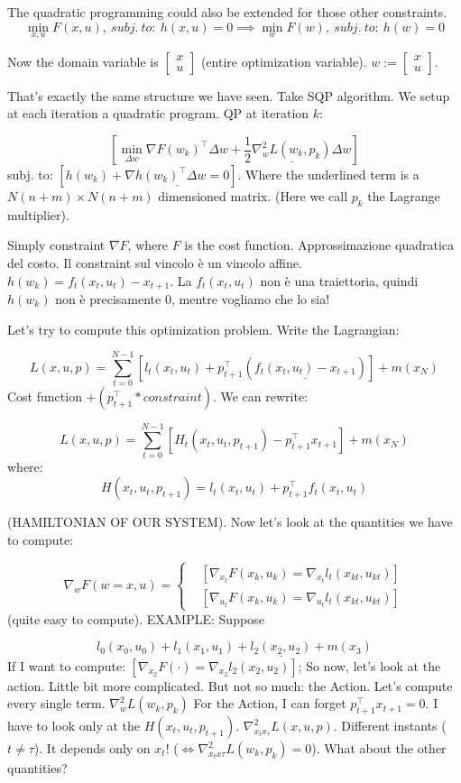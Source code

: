 The quadratic programming could also be extended for those other constraints.
\[
	\min_{x,u}{F(x,u)},\ subj.\ to:\ h(x,u)=0 \implies \min_w{F(w)},\ subj.\ to:\ h(w)=0
\]

Now the domain variable is $\begin{bmatrix}x\\u\end{bmatrix}$ (entire optimization variable). $w := \begin{bmatrix}x\\u\end{bmatrix}$.

That's exactly the same structure we have seen. Take SQP algorithm. We setup at each iteration a quadratic program. QP at iteration $k$:

\[
	[\min_{\Delta w}{\nabla{F(w_k)}^\top\Delta w + \frac{1}{2}\underline{\nabla^2_w{L(w_k,p_k)}}\Delta w}]
\]
subj. to: $[h(w_k) + \underline{\nabla{h(w_k)}^\top\Delta w = 0}]$. Where the underlined term is a $N(n+m)\times N(n+m)$ dimensioned matrix. (Here we call $p_k$ the Lagrange multiplier).

Simply constraint $\nabla{F}$, where $F$ is the cost function. Approssimazione quadratica del costo. Il constraint sul vincolo è un vincolo affine. $h(w_k) = f_t(x_t,u_t) - x_{t+1}$. La $f_t(x_t,u_t)$ non è una traiettoria, quindi $h(w_k)$ non è precisamente 0, mentre vogliamo che lo sia!

Let's try to compute this optimization problem. Write the Lagrangian:

\[
	L(x,u,p) = \sum_{t=0}^{N-1}{[l_t(x_t,u_t) + p_{t+1}^\top(\underline{f_t(x_t,u_t) - x_{t+1}})]} + m(x_N)
\]
Cost function $+ (p_{t+1}^\top * constraint)$. We can rewrite:

\[
	L(x,u,p) = \sum_{t=0}^{N-1}{[H_t(x_t,u_t,p_{t+1}) - p_{t+1}^\top x_{t+1}]} + m(x_N)
\]
where:
\[
	H(x_t,u_t,p_{t+1}) = l_t(x_t,u_t) + p_{t+1}^\top f_t(x_t,u_t)
\]

(HAMILTONIAN OF OUR SYSTEM). Now let's look at the quantities we have to compute:

\[
	\nabla_w{F(w = x,u)} =
	\left\{
	\begin{aligned}
	&[\nabla_{x_t}{F(x_k,u_k)} = \nabla_{x_t}{l_t(x_{kt},u_{kt})}]\\
	&[\nabla_{u_t}{F(x_k,u_k)} = \nabla_{u_t}{l_t(x_{kt},u_{kt})}]
	\end{aligned}
	\right.
\]
(quite easy to compute). EXAMPLE: Suppose

\[
	l_0(x_0,u_0) + l_1(x_1,u_1) + \underline{l_2(x_2,u_2)} + m(x_3)
\]
If I want to compute: $[\nabla_{x_2}{F(\mathord{\cdot})} = \nabla_{x_2}{l_2(x_2,u_2)}]$;
So now, let's look at the action. Little bit more complicated. But not so much: the Action. Let's compute every single term. $\nabla^2_w{L(w_k,p_k)}$ For the Action, I can forget $p_{t+1}^\top x_{t+1} = 0$. I have to look only at the $H(x_t,u_t,p_{t+1})$.
$\nabla^2_{\underline{x_tx_\tau}}{L(x,u,p)}$. Different instants ($t\neq\tau$). It depends only on $x_t$! ($\iff \nabla^2_{x_tx\tau}{L(w_k,p_k)} = 0$). What about the other quantities?

